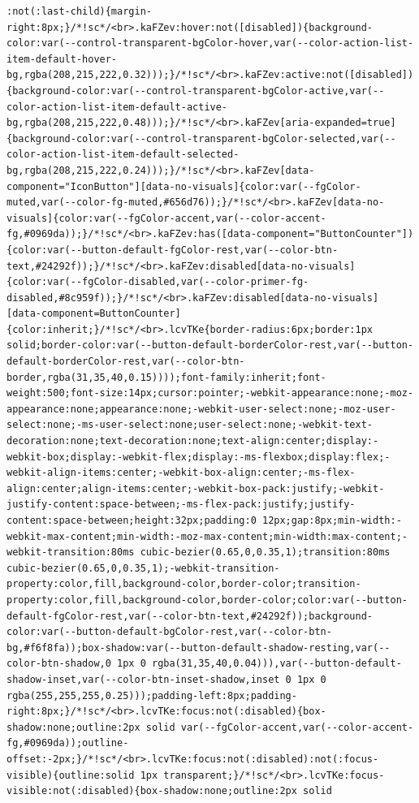 \documentclass[
  letterpaper,
]{book}
\begin{document}
\begin{verbatim}
:not(:last-child){margin-right:8px;}/*!sc*/<br>.kaFZev:hover:not([disabled]){background-color:var(--control-transparent-bgColor-hover,var(--color-action-list-item-default-hover-bg,rgba(208,215,222,0.32)));}/*!sc*/<br>.kaFZev:active:not([disabled]){background-color:var(--control-transparent-bgColor-active,var(--color-action-list-item-default-active-bg,rgba(208,215,222,0.48)));}/*!sc*/<br>.kaFZev[aria-expanded=true]{background-color:var(--control-transparent-bgColor-selected,var(--color-action-list-item-default-selected-bg,rgba(208,215,222,0.24)));}/*!sc*/<br>.kaFZev[data-component="IconButton"][data-no-visuals]{color:var(--fgColor-muted,var(--color-fg-muted,#656d76));}/*!sc*/<br>.kaFZev[data-no-visuals]{color:var(--fgColor-accent,var(--color-accent-fg,#0969da));}/*!sc*/<br>.kaFZev:has([data-component="ButtonCounter"]){color:var(--button-default-fgColor-rest,var(--color-btn-text,#24292f));}/*!sc*/<br>.kaFZev:disabled[data-no-visuals]{color:var(--fgColor-disabled,var(--color-primer-fg-disabled,#8c959f));}/*!sc*/<br>.kaFZev:disabled[data-no-visuals] [data-component=ButtonCounter]{color:inherit;}/*!sc*/<br>.lcvTKe{border-radius:6px;border:1px solid;border-color:var(--button-default-borderColor-rest,var(--button-default-borderColor-rest,var(--color-btn-border,rgba(31,35,40,0.15))));font-family:inherit;font-weight:500;font-size:14px;cursor:pointer;-webkit-appearance:none;-moz-appearance:none;appearance:none;-webkit-user-select:none;-moz-user-select:none;-ms-user-select:none;user-select:none;-webkit-text-decoration:none;text-decoration:none;text-align:center;display:-webkit-box;display:-webkit-flex;display:-ms-flexbox;display:flex;-webkit-align-items:center;-webkit-box-align:center;-ms-flex-align:center;align-items:center;-webkit-box-pack:justify;-webkit-justify-content:space-between;-ms-flex-pack:justify;justify-content:space-between;height:32px;padding:0 12px;gap:8px;min-width:-webkit-max-content;min-width:-moz-max-content;min-width:max-content;-webkit-transition:80ms cubic-bezier(0.65,0,0.35,1);transition:80ms cubic-bezier(0.65,0,0.35,1);-webkit-transition-property:color,fill,background-color,border-color;transition-property:color,fill,background-color,border-color;color:var(--button-default-fgColor-rest,var(--color-btn-text,#24292f));background-color:var(--button-default-bgColor-rest,var(--color-btn-bg,#f6f8fa));box-shadow:var(--button-default-shadow-resting,var(--color-btn-shadow,0 1px 0 rgba(31,35,40,0.04))),var(--button-default-shadow-inset,var(--color-btn-inset-shadow,inset 0 1px 0 rgba(255,255,255,0.25)));padding-left:8px;padding-right:8px;}/*!sc*/<br>.lcvTKe:focus:not(:disabled){box-shadow:none;outline:2px solid var(--fgColor-accent,var(--color-accent-fg,#0969da));outline-offset:-2px;}/*!sc*/<br>.lcvTKe:focus:not(:disabled):not(:focus-visible){outline:solid 1px transparent;}/*!sc*/<br>.lcvTKe:focus-visible:not(:disabled){box-shadow:none;outline:2px solid 
\end{verbatim}
\end{document}
